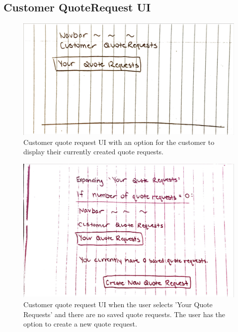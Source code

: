\documentclass[12pt, titlepage]{article}
\begin{document}
\subsection{Customer QuoteRequest UI}
\begin{figure}[H]
    \centering
    \includegraphics[width=\textwidth]{Design/SystDesign/Quotes/QuoteRequest1.png}
    \caption{Customer quote request UI with an option for the customer to display their currently created quote requests.}
    \label{fig:quoteRequestUI1}
\end{figure}

\begin{figure}[H]
    \centering
    \includegraphics[width=\textwidth]{Design/SystDesign/Quotes/QuoteRequest2.png}
    \caption{Customer quote request UI when the user selects 'Your Quote Requests' and there are no saved quote requests. The user has the option to create a new quote request.}
    \label{fig:quoteRequestUI2}
\end{figure}
\end{document}
